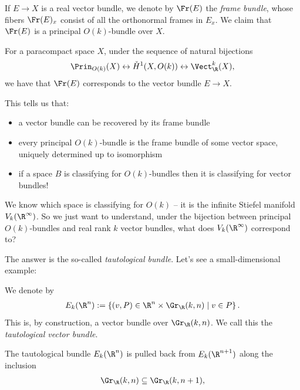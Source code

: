 \documentclass[11pt]{amsart}
\begin{document}
\begin{definition}\label{def:frame-bundle} If $E \to X$ is a real vector bundle, we denote by $\Fr(E)$ the \emph{frame bundle}, whose fibers $\Fr(E)_x$ consist of all the orthonormal frames in $E_x$. We claim that $\Fr(E)$ is a principal $O(k)$-bundle over $X$.
\end{definition}

\begin{exercise}\label{exer:frame-bundle-is-associated} 
For a paracompact space $X$, under the sequence of natural bijections
\begin{align*}
    \Prin_{O(k)}(X) \leftrightarrow \check{H}^1(X,O(k)) \leftrightarrow \Vect_\R^k(X),
\end{align*}
we have that $\Fr(E)$ corresponds to the vector bundle $E \to X$.
\end{exercise}
This tells us that:
\begin{itemize}
    \item a vector bundle can be recovered by its frame bundle
    \item every principal $O(k)$-bundle is the frame bundle of some vector space, uniquely determined up to isomorphism
    \item if a space $B$ is classifying for $O(k)$-bundles then it is classifying for vector bundles!
\end{itemize}

We know which space is classifying for $O(k)$ -- it is the infinite Stiefel manifold $V_k(\R^\infty)$. So we just want to understand, under the bijection between principal $O(k)$-bundles and real rank $k$ vector bundles, what does $V_k(\R^\infty)$ correspond to?

The answer is the so-called \emph{tautological bundle}. Let's see a small-dimensional example:

\begin{notation} We denote by
\begin{align*}
    E_k(\R^n) := \left\{ (v,P) \in \R^n \times \Gr_\R(k,n) \mid v\in P \right\}.
\end{align*}
This is, by construction, a vector bundle over $\Gr_\R(k,n)$. We call this the \emph{tautological vector bundle}.
\end{notation}

\begin{proposition}
The tautological bundle $E_k(\R^n)$ is pulled back from $E_{k}(\R^{n+1})$ along the inclusion
\begin{align*}
    \Gr_\R(k,n) \subseteq \Gr_\R(k,n+1),
\end{align*}
\end{proposition}
\end{document}
